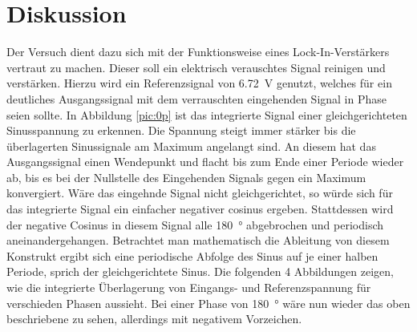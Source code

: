 \section{Diskussion}
\label{sec:Diskussion}

Der Versuch dient dazu sich mit der Funktionsweise eines Lock-In-Verstärkers
vertraut zu machen. Dieser soll ein elektrisch verauschtes Signal reinigen
und verstärken. Hierzu wird ein Referenzsignal von \SI{6.72}{\volt}
genutzt, welches für ein deutliches Ausgangssignal mit dem verrauschten
eingehenden Signal in Phase seien sollte. In Abbildung \ref{pic:0p}
ist das integrierte Signal einer gleichgerichteten Sinusspannung zu erkennen.
Die Spannung steigt immer stärker bis die überlagerten Sinussignale
am Maximum angelangt sind. An diesem hat das Ausgangssignal einen Wendepunkt
und flacht bis zum Ende einer Periode wieder ab, bis es bei der
Nullstelle des Eingehenden Signals gegen ein Maximum konvergiert.
Wäre das eingehnde Signal nicht gleichgerichtet, so würde sich
für das integrierte Signal ein einfacher negativer cosinus ergeben.
Stattdessen wird der negative Cosinus in diesem Signal alle \SI{180}{\degree}
abgebrochen und periodisch aneinandergehangen. Betrachtet man mathematisch die Ableitung
von diesem Konstrukt ergibt sich eine periodische Abfolge des Sinus
auf je einer halben Periode, sprich der gleichgerichtete Sinus.
Die folgenden 4 Abbildungen zeigen, wie die integrierte Überlagerung
von Eingangs- und Referenzspannung für verschieden Phasen aussieht. Bei einer Phase von
\SI{180}{\degree} wäre nun wieder das oben beschriebene zu sehen, allerdings mit
negativem Vorzeichen.

